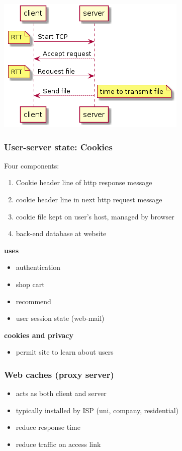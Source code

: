 \documentclass[11pt]{article}
\begin{document}
\begin{center}
\includegraphics[width=.9\linewidth]{../img/http.png}
\end{center}

\subsubsection{User-server state: Cookies}
\label{sec:org10dd043}
Four components:
\begin{enumerate}
\item Cookie header line of http response message
\item cookie header line in next http request message
\item cookie file kept on user's host, managed by browser
\item back-end database at website
\end{enumerate}

\textbf{uses}
\begin{itemize}
\item authentication
\item shop cart
\item recommend
\item user session state (web-mail)
\end{itemize}

\textbf{cookies and privacy}
\begin{itemize}
\item permit site to learn about users
\end{itemize}

\subsubsection{Web caches (proxy server)}
\label{sec:orgc39c438}
\begin{itemize}
\item acts as both client and server
\item typically installed by ISP (uni, company, residential)
\item reduce response time
\item reduce traffic on access link
\end{itemize}
\end{document}
